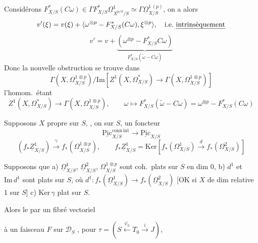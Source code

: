 \documentclass[11pt,a4paper]{article}
\begin{document}

Considérons $F^{*}_{X/S}(C\omega) \in \Gamma F^{*}_{X/S}\underline{\Omega}^{1}_{X^{p/S}/S} \simeq \Gamma \underline{\Omega}^{1\,(p)}_{X/S}$, on a alors
\[
v'(\xi) = v(\xi) + \langle \omega^{\otimes p} - F^{*}_{X/S}(C\omega), \xi^{\otimes p} \rangle, \quad \text{i.e.\ \uncertain{intrinsèquement}}
\]
\[
v' = v + \underbrace{(\omega^{\otimes p} - F^{*}_{X/S}C\omega)}_{F^{*}_{X/S}(\tilde{\omega} - C\omega)}
\]
Donc la nouvelle obstruction se trouve dans
\[
\Gamma(X, \Omega^{1\,\otimes p}_{X/S})/\mathrm{Im}[Z^{1}(X, \Omega^{*}_{X/S}) \to \Gamma(X, \Omega^{1\,\otimes p}_{X/S})]
\]
l'homom.\ étant
\[
Z^{1}(X, \Omega^{*}_{X/S}) \to \Gamma(X, \Omega^{1\,\otimes p}_{X/S}), \qquad \omega \mapsto F^{*}_{X/S}(\tilde{\omega} - C\omega) = \omega^{\otimes p} - F^{*}_{X/S}(C\omega)
\]

Supposons $X$ propre sur $S$,  \ill{}, on  sur $S$, un foncteur
\[
\underline{\mathrm{Pic}}^{\mathrm{conn\,int}}_{X/S} \to \underline{\mathrm{Pic}}_{X/S}
\]
\[
(f_{*}\underline{Z}^{1}_{X/S}) \xrightarrow{\gamma} f_{*}(\Omega^{1\,\otimes p}_{X/S}), \qquad f_{*}\underline{Z}^{1}_{X/S} = \mathrm{Ker}[f_{*}(\Omega^{1}_{X/S}) \xrightarrow{d} f_{*}(\Omega^{2}_{X/S})]
\]

Supposons que
a) $\underline{\Omega}^{1}_{X/S}$, $\underline{\Omega}^{2}_{X/S}$, $\Omega^{1\,\otimes p}_{X/S}$ sont coh.\ plats sur $S$ en dim 0,
b) \emph{} $d^{1}$ et $\mathrm{Im}\, d^{1}$ sont plats sur $S$, où $d^{1} : f_{*}(\underline{\Omega}^{1}_{X/S}) \to f_{*}(\underline{\Omega}^{2}_{X/S})$
[OK si $X$ de dim relative 1 sur $S$]
c)  $\mathrm{Ker}\, \gamma$  plat sur $S$.

Alors le \ill{} \ill{} \ill{}    par un fibré vectoriel

 à un faisceau $F$ sur $\mathcal{D}_{S}$ , pour $\tau = (S \xleftarrow{\varphi_{0}} T_{0} \xrightarrow{i} J)$,
\end{document}
